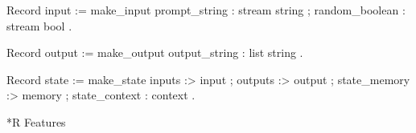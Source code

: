 \documentclass{beamer}
\begin{document}
\frame{\questiontoc}

\begin{frame}[fragile]
    \label{frame:input:output}

\begin{coqcode}
Record input := make_input {
    prompt_string : stream string ;
    random_boolean : stream bool
  }.
\end{coqcode}

\begin{coqcode}
Record output := make_output {
    output_string : list string
  }.
\end{coqcode}

\begin{coqcode}
Record state := make_state {
    inputs :> input ;
    outputs :> output ;
    state_memory :> memory ;
    state_context : context
  }.
\end{coqcode}

\end{frame}

\frame{\questiontoc}

\sectionframe**{R Features}{\label{frame:RFeatures}}
\end{document}

